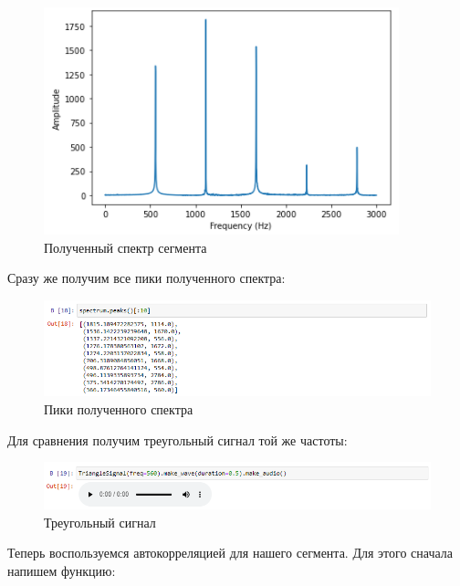 \documentclass[a4paper]{article}
\begin{document}
            \begin{figure}[H]
                \centering
                \includegraphics{ex_4_spectr.png}
                \caption{Полученный спектр сегмента}
                \label{fig:ex_4_spectr}
            \end{figure}
            
            Сразу же получим все пики полученного спектра:
            
            \begin{figure}[H]
                \centering
                \includegraphics[width=\textwidth]{ex_4_spectr_peaks.png}
                \caption{Пики полученного спектра}
                \label{fig:ex_4_spectr_peaks}
            \end{figure}
            
            Для сравнения получим треугольный сигнал той же частоты:
            
            \begin{figure}[H]
                \centering
                \includegraphics[width=\textwidth]{ex_4_triangle_audio.png}
                \caption{Треугольный сигнал}
                \label{fig:ex_4_triangle_audio}
            \end{figure}
            
            Теперь воспользуемся автокорреляцией для нашего сегмента. Для этого сначала напишем функцию:
            
\end{document}
